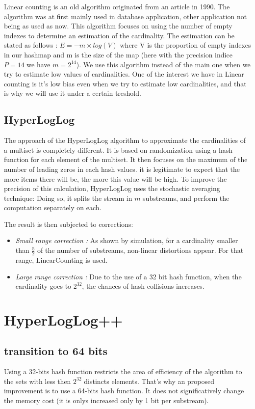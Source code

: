 \documentclass{article}
\begin{document}
Linear counting is an old algorithm originated from an article in 1990. The algorithm 
was at first mainly used in database application, other application not being as used 
as now. This algorithm focuses on using the number of empty indexes to determine an
estimation of the cardinality. The estimation can be stated as follows : $E = -m\times
log(V)$ where V is the proportion of empty indexes in our hashmap and m is the size of 
the map (here with the precision indice $P=14$ we have $m=2^{14}$). 
We use this algorithm instead of the main one when we try to estimate low values of 
cardinalities. One of the interest we have in Linear counting is it's low bias even when 
we try to estimate low cardinalities, and that is why we will use it under a certain treshold. 

\subsection{HyperLogLog}
The approach of the HyperLogLog algorithm to approximate the
cardinalities of a multiset is completely different. It is based on
randomization using a hash function for each element of the
multiset. It then focuses on the maximum of the number of leading
zeros in each hash values. it is legitimate to expect that the more
items there will be, the more this value will be high.  To improve the
precision of this calculation, HyperLogLog uses the stochastic
averaging technique: Doing so, it splits the stream in $m$ substreams,
and perform the computation separately on each.

The result is then subjected to corrections:
\begin{itemize}
\item \emph{Small range correction :} As shown by simulation, for a
cardinality smaller than $\frac{5}{2}$ of the number of substreams, non-linear
distortions appear. For that range, LinearCounting is used.
\item \emph{Large range correction :} Due to the use of a 32 bit hash
function, when the cardinality goes to $2^{32}$, the chances of hash
collisions increases.
\end{itemize}

\section{HyperLogLog++}

\subsection{transition to 64 bits}
Using a 32-bits hash function restricts the area of efficiency of the
algorithm to the sets with less then $2^{32}$ distincts elements.
That's why an proposed improvement is to use a 64-bits hash function.
It does not significatively change the memory cost (it is
onlys increased only by 1 bit per substream).
\end{document}
